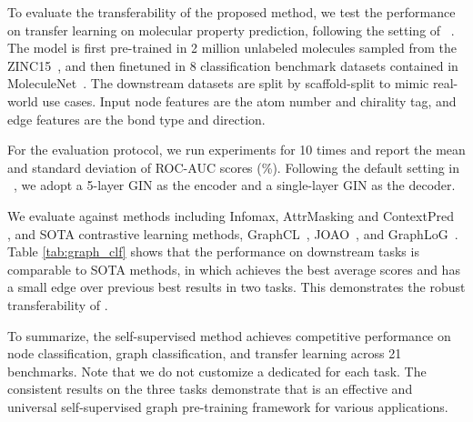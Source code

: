 To evaluate the transferability of the proposed method, we test the performance on transfer learning on molecular property prediction, following the setting of ~\cite{hu2020strategies,you2020graph,you2021graph}. The model is first pre-trained in  2 million unlabeled molecules sampled from the ZINC15~\cite{sterling2015zinc}, and then finetuned in 8 classification benchmark datasets contained in MoleculeNet~\cite{wu2018moleculenet}. The downstream datasets are split by scaffold-split to mimic real-world use cases. Input node features are the atom number and chirality tag, and edge features are the bond type and direction. 


For the evaluation protocol,  we run experiments for 10 times and report the mean and standard deviation of ROC-AUC scores (\%). Following the default setting in ~\cite{hu2020strategies},  we adopt a 5-layer GIN as the encoder and a single-layer GIN as the decoder.


We evaluate \model against methods including Infomax, AttrMasking and ContextPred~\cite{hu2020strategies} , and SOTA contrastive learning methods, GraphCL~\cite{you2020graph}, JOAO~\cite{you2021graph}, and GraphLoG~\cite{xu2021self}. Table \ref{tab:graph_clf} shows that the performance on downstream tasks is comparable to SOTA methods, in which \model achieves the best average scores and has a small edge over previous best results in two tasks. 
This demonstrates the robust transferability of \model.


To summarize,  the self-supervised \model  method achieves  competitive performance on node classification, graph classification, and transfer learning across 21 benchmarks. Note that we do not customize a dedicated \model for each task. 
The consistent results on the three tasks demonstrate that \model is an effective and universal self-supervised graph pre-training framework for various applications. 















